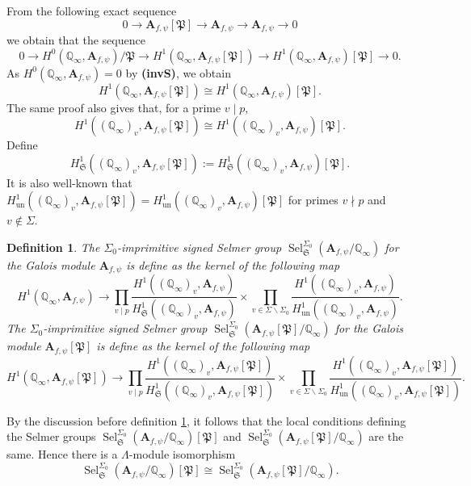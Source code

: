 \documentclass{amsart}
\newcommand{\ur}{\mathrm{un}}
\newcommand{\Q}{\mathbb{Q}}
\newcommand{\fS}{\mathfrak{S}}
\newcommand{\bA}{\mathbf{A}}
\newcommand{\Sel}{\operatorname{Sel}}
\newtheorem{auxiliary proposition}[theorem]{Auxiliary Proposition}
\newtheorem{definition}[theorem]{Definition}
\newtheorem{main conjecture}[theorem]{Main Conjecture}
\newtheorem{main theorem}[theorem]{Main Theorem}
\newtheorem{modesty proposition}[theorem]{Modesty Proposition}
\newtheorem{open problem}[theorem]{Open Problem}
\newtheorem{convergence lemma}[theorem]{Convergence Lemma}
\newtheorem{corrected lemma}[theorem]{Corrected Lemma}
\newtheorem{growth lemma}[theorem]{Growth Lemma}
\newtheorem{coefficient lemma}[theorem]{Integrality Lemma}
\newtheorem{interpolation lemma}[theorem]{Interpolation Lemma}
\newtheorem{kernel lemma}[theorem]{Kernel Lemma}
\newtheorem{limit lemma}[theorem]{Limit Lemma}
\newtheorem{tandem lemma}[theorem]{Modesty Lemma}
\newtheorem{zero-finding lemma}[theorem]{Zero-Finding Lemma}
\begin{document}
From the following exact sequence 
$$0 \rightarrow \bA_{f, \psi}[\mathfrak{P}] \rightarrow \bA_{f, \psi} \rightarrow \bA_{f, \psi} \rightarrow 0 $$
we obtain that the sequence 
$$ 0 \rightarrow H^0(\Q_\infty, \bA_{f, \psi})/\mathfrak{P} \rightarrow H^1(\Q_\infty, \bA_{f, \psi}[\mathfrak{P}] ) \rightarrow H^1(\Q_\infty,\bA_{f, \psi})[\mathfrak{P}] \rightarrow 0. $$
As $H^0(\Q_\infty, \bA_{f, \psi})=0$ by \textbf{(invS)}, we obtain $$H^1(\Q_\infty, \bA_{f, \psi}[\mathfrak{P}] ) \cong H^1(\Q_\infty,\bA_{f, \psi})[\mathfrak{P}]. $$ The same proof also gives that, for a prime $v \mid p$, 
$$H^1((\Q_\infty)_v, \bA_{f, \psi}[\mathfrak{P}] ) \cong H^1((\Q_\infty)_v,\bA_{f, \psi})[\mathfrak{P}]. $$
Define $$H^1_{\fS}((\Q_\infty)_v, \bA_{f, \psi}[\mathfrak{P}] ):=H^1_{\fS}((\Q_\infty)_v, \bA_{f, \psi})[\mathfrak{P}].$$
It is also well-known that $H^1_{\ur}((\Q_\infty)_v,\bA_{f, \psi}[\mathfrak{P}])=H^1_{\ur}((\Q_\infty)_v,\bA_{f, \psi})[\mathfrak{P}]$ for primes $v\nmid p$ and $v\not\in \Sigma.$ 
\begin{definition}\label{def:imprimitive} The $\Sigma_0$-imprimitive signed Selmer group $\Sel_{\fS}^{\Sigma_0}(\bA_{f,\psi}/\Q_\infty)$ for the Galois module $\bA_{f,\psi}$ is define as the kernel of the following map 
$$H^1(\Q_\infty,\bA_{f, \psi}) \rightarrow \prod_{v \mid p} \frac{H^1((\Q_\infty)_v,\bA_{f, \psi})}{H_{\fS}^1((\Q_\infty)_v,\bA_{f, \psi})}  \times \prod_{v \in \Sigma\backslash \Sigma_0}\frac{H^1((\Q_\infty)_v,\bA_{f, \psi})}{H^1_{\ur}((\Q_\infty)_v,\bA_{f, \psi})}.$$
The $\Sigma_0$-imprimitive signed Selmer group $\Sel_{\fS}^{\Sigma_0}(\bA_{f,\psi}[\mathfrak{P}]/\Q_\infty)$ for the Galois module $\bA_{f,\psi}[\mathfrak{P}]$ is define as the kernel of the following map 
$$H^1(\Q_\infty,\bA_{f, \psi}[\mathfrak{P}]) \rightarrow \prod_{v \mid p} \frac{H^1((\Q_\infty)_v,\bA_{f, \psi}[\mathfrak{P}])}{H_{\fS}^1((\Q_\infty)_v,\bA_{f, \psi}[\mathfrak{P}])}  \times \prod_{v \in \Sigma\backslash \Sigma_0}\frac{H^1((\Q_\infty)_v,\bA_{f, \psi}[\mathfrak{P}])}{H^1_{\ur}((\Q_\infty)_v,\bA_{f, \psi}[\mathfrak{P}])}.$$  
\end{definition}
By the discussion before definition \ref{def:imprimitive}, it follows that the local conditions defining the Selmer groups $\Sel_{\fS}^{\Sigma_0}(\bA_{f,\psi}/\Q_\infty)[\mathfrak{P}]$ and $ \Sel_{\fS}^{\Sigma_0}(\bA_{f,\psi}[\mathfrak{P}]/\Q_\infty)$ are the same. Hence there is a $\Lambda$-module isomorphism 
\begin{equation}\label{eq:jishnu18}
    \Sel_{\fS}^{\Sigma_0}(\bA_{f,\psi}/\Q_\infty)[\mathfrak{P}] \cong  \Sel_{\fS}^{\Sigma_0}(\bA_{f,\psi}[\mathfrak{P}]/\Q_\infty).
\end{equation}
\end{document}
